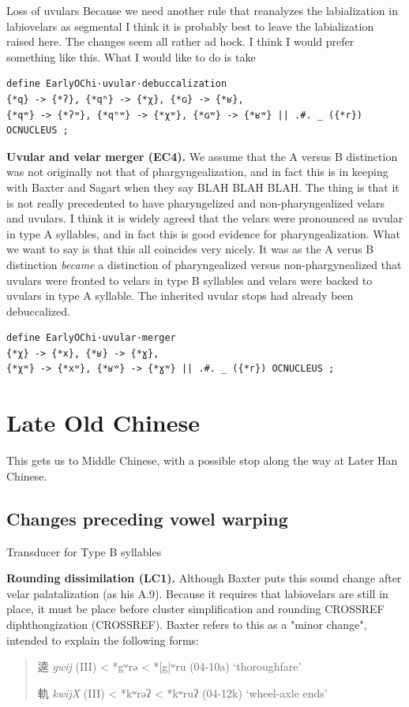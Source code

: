 \documentclass[xetex, svgnames, 12pt]{scrartcl}
\newcounter{para}
\newcommand\mypara[1]{\par\refstepcounter{para}\textbf{\thepara\space#1\space}}
\begin{document}
Loss of uvulars
Because we need another rule that reanalyzes the labialization in labiovelars as segmental
I think it is probably best to leave the labialization raised here. The changes seem all rather
ad hock. I think I would prefer something like this. What I would like to do is take 
\begin{verbatim}
define EarlyOChi·uvular·debuccalization
{*q} -> {*ʔ}, {*qʰ} -> {*χ}, {*ɢ} -> {*ʁ},
{*qʷ} -> {*ʔʷ}, {*qʰʷ} -> {*χʷ}, {*ɢʷ} -> {*ʁʷ} || .#. _ ({*r}) OCNUCLEUS ;
\end{verbatim}

\mypara{Uvular and velar merger (EC4).}
\label{par:uvularmerger}
We assume that the A versus B distinction was not originally not that of phargyngealization, and in fact this is in keeping with Baxter and Sagart when they say BLAH BLAH BLAH. The thing is that it is not really precedented to have pharyngelized and non-pharyngealized velars and uvulars. I think it is widely agreed that the velars were pronounced as uvular in type A syllables, and in fact this is good evidence for pharyngealization. What we want to say is that this all coincides very nicely. It was as the A verus B distinction \textit{became} a distinction of pharyngealized versus non-phargynealized that uvulars were fronted to velars in type B syllables and velars were backed to uvulars in type A syllable. The inherited uvular stops had already been debuccalized. 

\begin{verbatim}
define EarlyOChi·uvular·merger
{*χ} -> {*x}, {*ʁ} -> {*ɣ},
{*χʷ} -> {*xʷ}, {*ʁʷ} -> {*ɣʷ} || .#. _ ({*r}) OCNUCLEUS ;
\end{verbatim}


\section{Late Old Chinese}
This gets us to Middle Chinese, with a possible stop along the way at Later Han Chinese. 

\subsection{Changes preceding vowel warping}
Transducer for Type B syllables 

\mypara{Rounding dissimilation (LC1).}
Although Baxter puts this sound change after velar palatalization (as his A.9). Because it requires that 
labiovelars are still in place, it must be place before cluster simplification and rounding CROSSREF
diphthongization (CROSSREF).  
Baxter refers to this as a "minor change", intended to explain the following forms:
\begin{quote}
逵 
\textit{gwij} (III) < *gʷrə < *[g]ʷru (04-10a) `thoroughfare'

軌 
\textit{kwijX} (III) < *kʷrəʔ < *kʷruʔ (04-12k) `wheel-axle ends' \end{quote}
\end{document}
